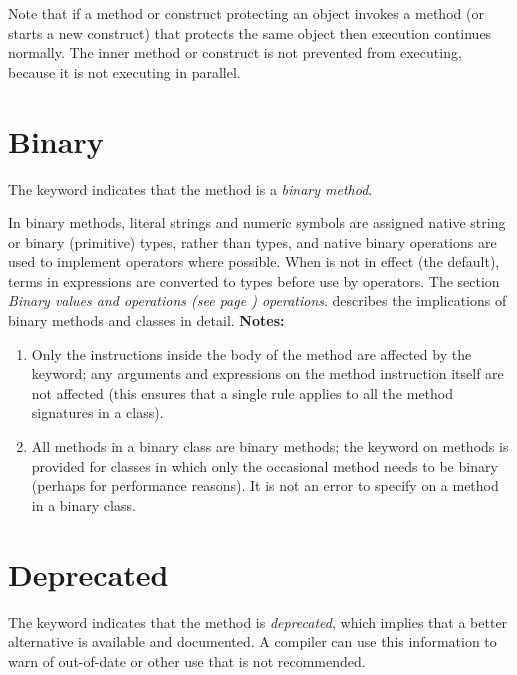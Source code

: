 Note that if a method or construct protecting an object invokes a method
(or starts a new construct) that protects the same object then execution
continues normally.  The inner method or construct is not prevented from
executing, because it is not executing in parallel.
\section{Binary}\label{refbinme}
 
The keyword  indicates that the method is a \emph{binary
method}.
 
In binary methods, literal strings and numeric symbols are assigned
native string or binary (primitive) types, rather than \nr{} types,
and native binary operations are used to implement operators where
possible.
When  is not in effect (the default), terms in
expressions are converted to \nr{} types before use by operators.
The section  \emph{Binary values and operations (see page \pageref{refbinary}) 
operations}. describes the implications of binary methods and
classes in detail.
 \textbf{Notes:}
\begin{enumerate}
\item 
Only the instructions inside the body of the method are affected by the
 keyword; any arguments and expressions on the method
instruction itself are not affected (this ensures that a single rule
applies to all the method signatures in a class).
\item 
All methods in a binary class are binary methods; the 
keyword on methods is provided for classes in which only the occasional
method needs to be binary (perhaps for performance reasons).
It is not an error to specify  on a method in a binary
class.
\end{enumerate}
\section{Deprecated}\label{refdepme}
 
The keyword  indicates that the method
is \emph{deprecated}, which implies that a better alternative is
available and documented.  A compiler can use this information to warn
of out-of-date or other use that is not recommended.
 
